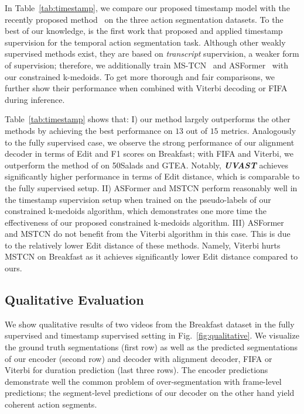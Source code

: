 In Table~\ref{tab:timestamp}, we compare our proposed timestamp model with the recently proposed method~\cite{timestamp2021} on the three action segmentation datasets.
To the best of our knowledge, \cite{timestamp2021} is the first work that proposed and applied timestamp supervision for the temporal action segmentation task. 
Although other weakly supervised methods exist, they are based on \textit{transcript} supervision, a weaker form of supervision; 
therefore, we additionally train MS-TCN~\cite{farha2019ms} and ASFormer~\cite{asformer} with our constrained k-medoids. To get more thorough and fair comparisons, we further show their performance when combined with Viterbi decoding or FIFA during inference.  

Table~\ref{tab:timestamp} shows that: I) our  method largely outperforms the other methods by achieving the best performance on $13$ out of $15$ metrics.
Analogously to the fully supervised case, we observe the strong performance of our alignment decoder in terms of Edit and F1 scores on Breakfast; with FIFA and Viterbi, we outperform the method of \cite{timestamp2021} on 50Salads and GTEA. Notably, \textbf{\textit{UVAST}} achieves significantly higher performance in terms of Edit distance, which is comparable to the fully supervised setup. II) ASFormer and MSTCN perform reasonably well in the timestamp supervision setup when trained on the pseudo-labels of our constrained k-medoids algorithm, which demonstrates one more time the effectiveness of our proposed constrained k-medoids algorithm. III) ASFormer and MSTCN do not benefit from the Viterbi algorithm in this case. This is due to the relatively lower Edit distance of these methods. Namely, Viterbi hurts MSTCN on Breakfast as it achieves significantly lower Edit distance compared to ours.


\subsection{Qualitative Evaluation}
We show qualitative results of two videos from the Breakfast dataset in the fully supervised and timestamp supervised setting in  Fig.~\ref{fig:qualitative}. We visualize the ground truth segmentations (first row) as well as the predicted segmentations of our encoder (second row) and decoder with alignment decoder, FIFA or Viterbi for duration prediction (last three rows).
The encoder predictions demonstrate well the common problem of over-segmentation with frame-level predictions; the segment-level predictions of our decoder on the other hand yield coherent action segments.

